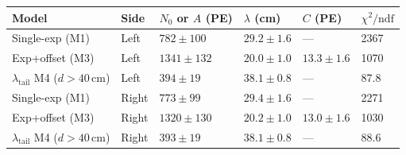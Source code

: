 \begin{tabular}{llllll}\toprule
Model & Side & $N_0$ or $A$ (PE) & $\lambda$ (cm) & $C$ (PE) & $\chi^2/\mathrm{ndf}$ \\
\midrule
Single-exp (M1) & Left & $782\pm100$ & $29.2\pm1.6$ & --- & 2367 \\
Exp+offset (M3) & Left & $1341\pm132$ & $20.0\pm1.0$ & $13.3\pm1.6$ & 1070 \\
$\lambda_\mathrm{tail}$ M4 ($d>40$\,cm) & Left & $394\pm19$ & $38.1\pm0.8$ & --- & 87.8 \\
Single-exp (M1) & Right & $773\pm99$ & $29.4\pm1.6$ & --- & 2271 \\
Exp+offset (M3) & Right & $1320\pm130$ & $20.2\pm1.0$ & $13.0\pm1.6$ & 1030 \\
$\lambda_\mathrm{tail}$ M4 ($d>40$\,cm) & Right & $393\pm19$ & $38.1\pm0.8$ & --- & 88.6 \\
\bottomrule\end{tabular}
